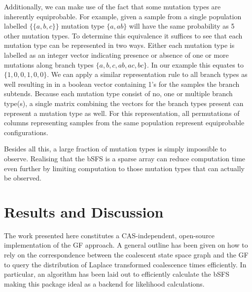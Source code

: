 \documentclass[10pt, a4]{article}
\begin{document}
Additionally, we can make use of the fact that some mutation types are inherently equiprobable. For example, given a sample from a single population labelled $\{\{a, b, c\}\}$ mutation type $\{a, ab\}$ will have the same probability as 5 other mutation types. To determine this equivalence it suffices to see that each mutation type can be represented in two ways. Either each mutation type is labelled as an integer vector indicating presence or absence of one or more mutations along branch types $\{a, b, c, ab, ac, bc\}$. In our example this equates to $\{1, 0, 0,1, 0, 0\}$. We can apply a similar representation rule to all branch types as well resulting in in a boolean vector containing 1's for the samples the branch subtends. Because each mutation type consist of no, one or multiple branch type(s), a single matrix combining the vectors for the branch types present can represent a mutation type as well. For this representation, all permutations of columns representing samples from the same population represent equiprobable configurations.

Besides all this, a large fraction of mutation types is simply impossible to observe. Realising that the bSFS is a sparse array can reduce computation time even further by limiting computation to those mutation types that can actually be observed.

\section{Results and Discussion}

The work presented here constitutes a CAS-independent, open-source implementation of the GF approach. A general outline has been given on how to rely on the correspondence between the coalescent state space graph and the GF to query the distribution of Laplace transformed coalescence times efficiently. In particular, an algorithm has been laid out to efficiently calculate the bSFS making this package ideal as a backend for likelihood calculations.
\end{document}
